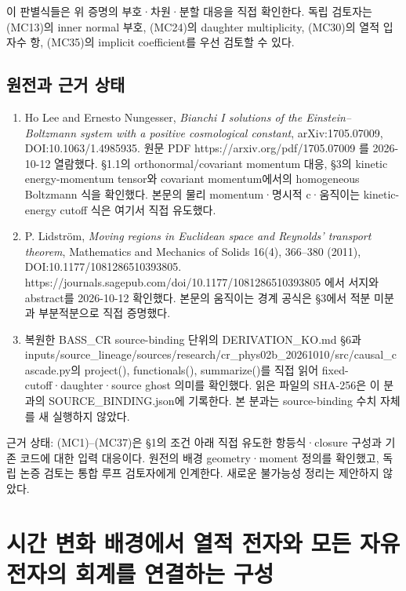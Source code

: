 \documentclass[11pt,a4paper]{article}
\providecommand{\tightlist}{\setlength{\itemsep}{2pt}\setlength{\parskip}{0pt}}
\begin{document}
이 판별식들은 위 증명의 부호·차원·분할 대응을 직접 확인한다. 독립 검토자는 (MC13)의 inner normal 부호, (MC24)의 daughter multiplicity, (MC30)의 열적 입자수 항, (MC35)의 implicit coefficient를 우선 검토할 수 있다.

\hypertarget{uxc6d0uxc804uxacfc-uxadfcuxac70-uxc0c1uxd0dc}{%
\subsection{원전과 근거 상태}\label{uxc6d0uxc804uxacfc-uxadfcuxac70-uxc0c1uxd0dc}}

\begin{enumerate}
\def\labelenumi{\arabic{enumi}.}
\tightlist
\item
  Ho Lee and Ernesto Nungesser, \emph{Bianchi I solutions of the Einstein--Boltzmann system with a positive cosmological constant}, arXiv:1705.07009, DOI:10.1063/1.4985935. 원문 PDF https://arxiv.org/pdf/1705.07009 를 2026-10-12 열람했다. §1.1의 orthonormal/covariant momentum 대응, §3의 kinetic energy-momentum tensor와 covariant momentum에서의 homogeneous Boltzmann 식을 확인했다. 본문의 물리 momentum·명시적 c·움직이는 kinetic-energy cutoff 식은 여기서 직접 유도했다.
\item
  P. Lidström, \emph{Moving regions in Euclidean space and Reynolds' transport theorem}, Mathematics and Mechanics of Solids 16(4), 366--380 (2011), DOI:10.1177/1081286510393805. https://journals.sagepub.com/doi/10.1177/1081286510393805 에서 서지와 abstract를 2026-10-12 확인했다. 본문의 움직이는 경계 공식은 §3에서 적분 미분과 부분적분으로 직접 증명했다.
\item
  복원한 BASS\_CR source-binding 단위의 DERIVATION\_KO.md §6과 inputs/source\_lineage/sources/research/cr\_phys02b\_20261010/src/causal\_cascade.py의 project(), functionals(), summarize()를 직접 읽어 fixed-cutoff·daughter·source ghost 의미를 확인했다. 읽은 파일의 SHA-256은 이 분과의 SOURCE\_BINDING.json에 기록한다. 본 분과는 source-binding 수치 자체를 새 실행하지 않았다.
\end{enumerate}

근거 상태: (MC1)--(MC37)은 §1의 조건 아래 직접 유도한 항등식·closure 구성과 기존 코드에 대한 입력 대응이다. 원전의 배경 geometry·moment 정의를 확인했고, 독립 논증 검토는 통합 루프 검토자에게 인계한다. 새로운 불가능성 정리는 제안하지 않았다.

\clearpage

\hypertarget{uxc2dcuxac04-uxbcc0uxd654-uxbc30uxacbduxc5d0uxc11c-uxc5f4uxc801-uxc804uxc790uxc640-uxbaa8uxb4e0-uxc790uxc720uxc804uxc790uxc758-uxd68cuxacc4uxb97c-uxc5f0uxacb0uxd558uxb294-uxad6cuxc131}{%
\section{시간 변화 배경에서 열적 전자와 모든 자유전자의 회계를 연결하는 구성}\label{uxc2dcuxac04-uxbcc0uxd654-uxbc30uxacbduxc5d0uxc11c-uxc5f4uxc801-uxc804uxc790uxc640-uxbaa8uxb4e0-uxc790uxc720uxc804uxc790uxc758-uxd68cuxacc4uxb97c-uxc5f0uxacb0uxd558uxb294-uxad6cuxc131}}
\end{document}
